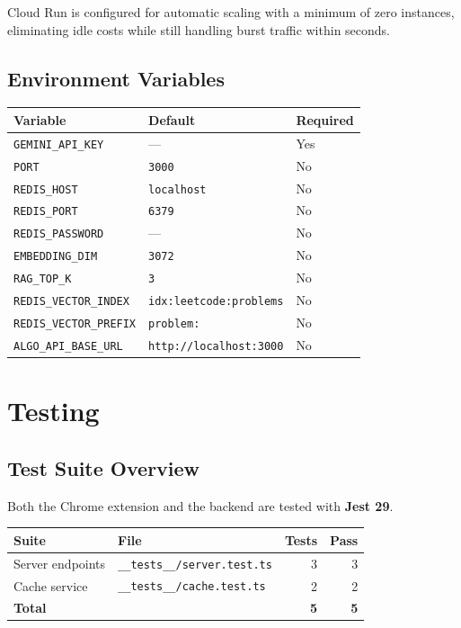 \documentclass[11pt,a4paper]{article}
\begin{document}
Cloud Run is configured for automatic scaling with a minimum of zero instances,
eliminating idle costs while still handling burst traffic within seconds.

\subsection{Environment Variables}

\begin{center}
\begin{tabular}{lll}
  \toprule
  \textbf{Variable} & \textbf{Default} & \textbf{Required} \\
  \midrule
  \texttt{GEMINI\_API\_KEY}      & ---               & Yes \\
  \texttt{PORT}                  & \texttt{3000}     & No  \\
  \texttt{REDIS\_HOST}           & \texttt{localhost} & No \\
  \texttt{REDIS\_PORT}           & \texttt{6379}     & No  \\
  \texttt{REDIS\_PASSWORD}       & ---               & No  \\
  \texttt{EMBEDDING\_DIM}        & \texttt{3072}     & No  \\
  \texttt{RAG\_TOP\_K}           & \texttt{3}        & No  \\
  \texttt{REDIS\_VECTOR\_INDEX}  & \texttt{idx:leetcode:problems} & No \\
  \texttt{REDIS\_VECTOR\_PREFIX} & \texttt{problem:} & No  \\
  \texttt{ALGO\_API\_BASE\_URL}  & \texttt{http://localhost:3000} & No \\
  \bottomrule
\end{tabular}
\end{center}

\section{Testing}

\subsection{Test Suite Overview}

Both the Chrome extension and the backend are tested with \textbf{Jest 29}.

\begin{center}
\begin{tabular}{llrr}
  \toprule
  \textbf{Suite}        & \textbf{File}                        & \textbf{Tests} & \textbf{Pass} \\
  \midrule
  Server endpoints      & \texttt{\_\_tests\_\_/server.test.ts} & 3              & 3 \\
  Cache service         & \texttt{\_\_tests\_\_/cache.test.ts}  & 2              & 2 \\
  \midrule
  \textbf{Total}        &                                       & \textbf{5}     & \textbf{5} \\
  \bottomrule
\end{tabular}
\end{center}
\end{document}
